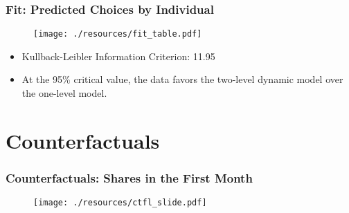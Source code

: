
\begin{frame}
\frametitle{Fit: Predicted Choices by Individual}

\begin{figure}[h!]
\centering\texttt{[image: ./resources/fit\_table.pdf]}
\end{figure}

\begin{itemize}
\item Kullback-Leibler Information Criterion: 11.95

\item At the 95\% critical value, the data favors the two-level dynamic
model over the one-level model.
\end{itemize}
\end{frame}

\section{Counterfactuals}


\begin{frame}
\frametitle{Counterfactuals: Shares in the First Month}

\begin{figure}[h!]
\centering\texttt{[image: ./resources/ctfl\_slide.pdf]}
\end{figure}
\end{frame}


